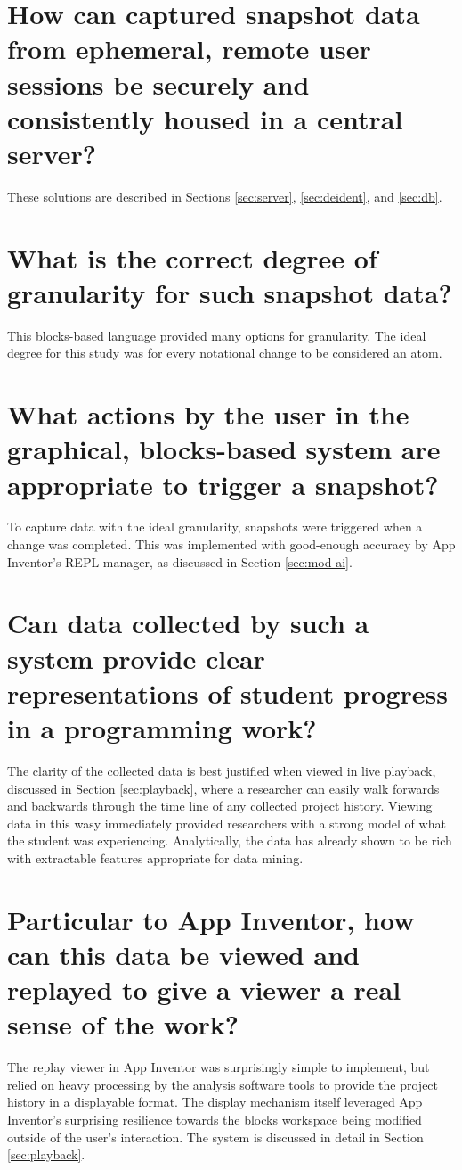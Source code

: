 \section{How can captured snapshot data from ephemeral, remote user sessions be securely and consistently housed in a central server? }
These solutions are described in Sections \ref{sec:server}, \ref{sec:deident}, and \ref{sec:db}.

\section{What is the correct degree of granularity for such snapshot data?}
This blocks-based language provided many options for granularity. The ideal degree for this study was for every notational change to be considered an atom.

\section{What actions by the user in the graphical, blocks-based system are appropriate to trigger a snapshot?}
To capture data with the ideal granularity, snapshots were triggered when a change was completed. This was implemented with good-enough accuracy by App Inventor's REPL manager, as discussed in Section \ref{sec:mod-ai}.

\section{Can data collected by such a system provide clear representations of student progress in a programming work?}
The clarity of the collected data is best justified when viewed in live playback, discussed in Section \ref{sec:playback}, where a researcher can easily walk forwards and backwards through the time line of any collected project history. Viewing data in this wasy immediately provided researchers with a strong model of what the student was experiencing. Analytically, the data has already shown to be rich with extractable features appropriate for data mining.

\section{Particular to App Inventor, how can this data be viewed and replayed to give a viewer a real sense of the work?}
The replay viewer in App Inventor was surprisingly simple to implement, but relied on heavy processing by the analysis software tools to provide the project history in a displayable format. The display mechanism itself leveraged App Inventor's surprising resilience towards the blocks workspace being modified outside of the user's interaction. The system is discussed in detail in Section \ref{sec:playback}.


